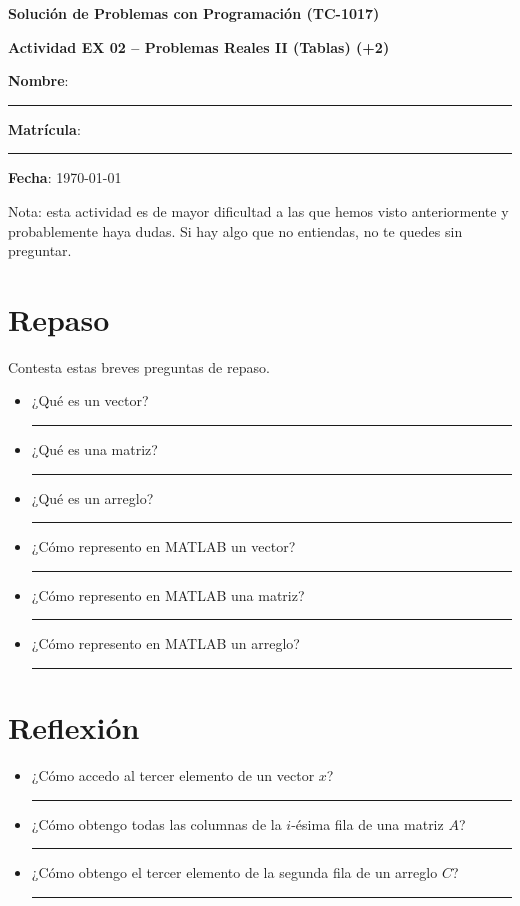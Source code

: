 \documentclass[spanish, 10pt]{article}
\newcommand{\responserule}{{\large\rule{14 cm}{0.3mm}}}
\newcommand{\veryshortresponserule}{{\large\rule{3 cm}{0.3mm}}}
\begin{document}
\begin{center}
	{\Large \textbf{Solución de Problemas con Programación (TC-1017)}}
	
	\bigskip
	{\large \textbf{Actividad EX 02 -- Problemas Reales II (Tablas) (+2)}}
\end{center}

\bigskip
{\large \textbf{Nombre}: \rule{13.7 cm}{0.4mm}}



\bigskip
{\large \textbf{Matrícula}: \rule{5 cm}{0.4mm}} \hfill {\large \textbf{Fecha}: \today}

\bigskip

{\footnotesize Nota: esta actividad es de mayor dificultad a las que hemos visto anteriormente y probablemente haya dudas.
Si hay algo que no entiendas, no te quedes sin preguntar.}

\section{Repaso}

Contesta estas breves preguntas de repaso.

\begin{itemize}
    \item ¿Qué es un vector? \\[3ex] \responserule
    \item ¿Qué es una matriz? \\[3ex] \responserule
    \item ¿Qué es un arreglo? \\[3ex] \responserule
    \item ¿Cómo represento en MATLAB un vector? \\[3ex] \responserule
    \item ¿Cómo represento en MATLAB una matriz? \\[3ex] \responserule
    \item ¿Cómo represento en MATLAB un arreglo? \\[3ex] \responserule
\end{itemize}

\section{Reflexión}

\begin{itemize}
	\item ¿Cómo accedo al tercer elemento de un vector $x$? \hfill \veryshortresponserule
	\item ¿Cómo obtengo todas las columnas de la $i$-ésima fila de una matriz $A$? \hfill \veryshortresponserule
	\item ¿Cómo obtengo el tercer elemento de la segunda fila de un arreglo $C$? \hfill \veryshortresponserule
\end{itemize}
\end{document}

